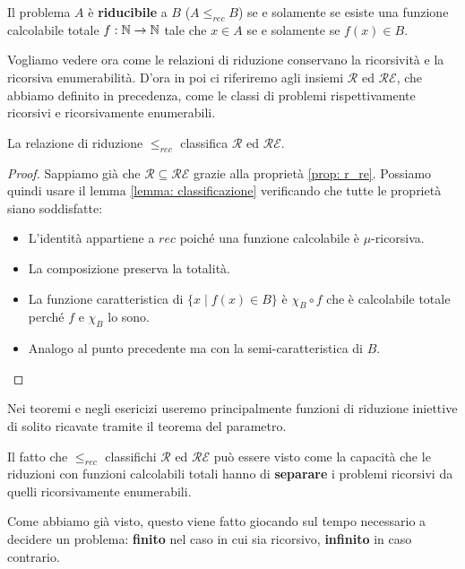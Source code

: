 \begin{definition}
	Il problema $A$ è \textbf{riducibile} a $B$ ($A \leq_{rec} B$)
	se e solamente se esiste una funzione calcolabile totale
	$f : \mathbb{N} \to \mathbb{N}$ tale che $x \in A$ se e solamente se
	$f(x) \in B$.
\end{definition}

Vogliamo vedere ora come le relazioni di riduzione conservano la
ricorsività e la ricorsiva enumerabilità. D'ora in poi ci
riferiremo agli insiemi $\mathcal{R}$ ed $\mathcal{RE}$, che
abbiamo definito in precedenza, come le classi di problemi
rispettivamente ricorsivi e ricorsivamente enumerabili.

\begin{theorem}
	La relazione di riduzione $\leq_{rec}$ classifica
	$\mathcal{R}$ ed $\mathcal{RE}$.
	\begin{proof}
		Sappiamo già che $\mathcal{R} \subseteq \mathcal{RE}$
		grazie alla proprietà \ref{prop: r_re}. Possiamo quindi
		usare il lemma \ref{lemma: classificazione} verificando
		che tutte le proprietà siano soddisfatte:
		\begin{itemize}
			\item L'identità appartiene a $rec$ poiché una
			      funzione calcolabile è $\mu$-ricorsiva.
			\item La composizione preserva la totalità.
			\item La funzione caratteristica di
			      $\{ x \mid f(x) \in B \}$ è $\chi_B \circ f$
			      che è calcolabile totale perché $f$ e $\chi_B$
			      lo sono.
			\item Analogo al punto precedente ma con la
			      semi-caratteristica di $B$.
		\end{itemize}
	\end{proof}
\end{theorem}

Nei teoremi e negli esericizi useremo principalmente funzioni
di riduzione iniettive di solito ricavate tramite il teorema
del parametro.

Il fatto che $\leq_{rec}$ classifichi $\mathcal{R}$ ed
$\mathcal{RE}$ può essere visto come la capacità che le
riduzioni con funzioni calcolabili totali hanno di
\textbf{separare} i problemi ricorsivi da quelli ricorsivamente
enumerabili.

Come abbiamo già visto, questo viene fatto giocando sul tempo
necessario a decidere un problema: \textbf{finito} nel caso
in cui sia ricorsivo, \textbf{infinito} in caso contrario.


